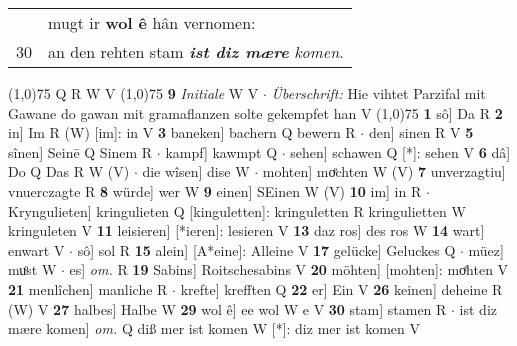 \documentclass[8pt,a4paper,notitlepage]{article}
\begin{document}
\begin{table}[ht]
\begin{minipage}[t]{0.5\linewidth}
\begin{tabular}{rl}
 & mugt ir \textbf{wol ê} hân vernomen:\\ 
30 & an den rehten stam \textit{\textbf{ist diz mære}} \textit{komen}.\\ 
\end{tabular}
\scriptsize
\line(1,0){75} \newline
Q R W V \newline
\line(1,0){75} \newline
\textbf{9} \textit{Initiale} W V   $\cdot$ \textit{Überschrift:} Hie vihtet Parzifal mit Gawane do gawan mit gramaflanzen solte gekempfet han V  \newline
\line(1,0){75} \newline
\textbf{1} sô] Da R \textbf{2} in] Im R (W) [im]: in  V \textbf{3} baneken] bachern Q bewern R  $\cdot$ den] sinen R V \textbf{5} sînen] Seinē Q Sinem R  $\cdot$ kampf] kawmpt Q  $\cdot$ sehen] schawen Q [*]: sehen V \textbf{6} dâ] Do Q Das R W (V)  $\cdot$ die wîsen] dise W  $\cdot$ mohten] moͤchten W (V) \textbf{7} unverzagtiu] vnuerczagte R \textbf{8} würde] wer W \textbf{9} einen] SEinen W (V) \textbf{10} im] in R  $\cdot$ Kryngulieten] kringulieten Q [kinguletten]: kringuletten R kringulietten W kringuleten V \textbf{11} leisieren] [*ieren]: lesieren V \textbf{13} daz ros] des ros W \textbf{14} wart] enwart V  $\cdot$ sô] sol R \textbf{15} alein] [A*eine]: Alleine V \textbf{17} gelücke] Geluckes Q  $\cdot$ müez] muͦst W  $\cdot$ es] \textit{om.} R \textbf{19} Sabins] Roitschesabins V \textbf{20} möhten] [mohten]: moͤhten V \textbf{21} menlîchen] manliche R  $\cdot$ krefte] krefften Q \textbf{22} er] Ein V \textbf{26} keinen] deheine R (W) V \textbf{27} halbes] Halbe W \textbf{29} wol ê] ee wol W e V \textbf{30} stam] stamen R  $\cdot$ ist diz mære komen] \textit{om.} Q diß mer ist komen W [*]: diz mer ist komen V \newline
\end{minipage}
\end{table}
\end{document}
